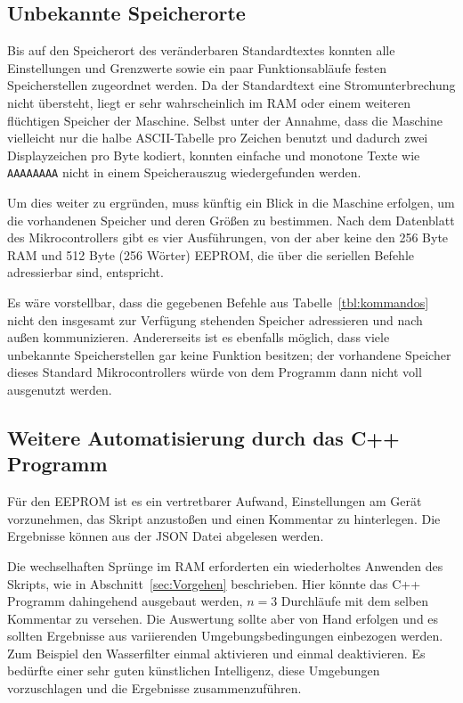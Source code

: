 \subsection{Unbekannte Speicherorte}\label{subsec:UnbekannteSpeicherorte}
Bis auf den Speicherort des veränderbaren Standardtextes konnten alle Einstellungen und Grenzwerte sowie ein paar Funktionsabläufe festen Speicherstellen zugeordnet werden.
Da der Standardtext eine Stromunterbrechung nicht übersteht, liegt er sehr wahrscheinlich im \ac{RAM} oder einem weiteren flüchtigen Speicher der Maschine.
Selbst unter der Annahme, dass die Maschine vielleicht nur die halbe \ac{ASCII}-Tabelle pro Zeichen benutzt und dadurch zwei Displayzeichen pro Byte kodiert, konnten einfache und monotone Texte wie \texttt{AAAAAAAA} nicht in einem Speicherauszug wiedergefunden werden.

Um dies weiter zu ergründen, muss künftig ein Blick in die Maschine erfolgen, um die vorhandenen Speicher und deren Größen zu bestimmen.
Nach dem Datenblatt des Mikrocontrollers \cite{JuraMicrocontroller} gibt es vier Ausführungen, von der aber keine den 256 Byte \ac{RAM} und 512 Byte (256 Wörter) \ac{EEPROM}, die über die seriellen Befehle adressierbar sind, entspricht.

Es wäre vorstellbar, dass die gegebenen Befehle aus Tabelle~\ref{tbl:kommandos} nicht den insgesamt zur Verfügung stehenden Speicher adressieren und nach außen kommunizieren.
Andererseits ist es ebenfalls möglich, dass viele unbekannte Speicherstellen gar keine Funktion besitzen;
der vorhandene Speicher dieses Standard Mikrocontrollers würde von dem Programm dann nicht voll ausgenutzt werden.

\subsection{Weitere Automatisierung durch das C++ Programm}
Für den \ac{EEPROM} ist es ein vertretbarer Aufwand, Einstellungen am Gerät vorzunehmen, das Skript anzustoßen und einen Kommentar zu hinterlegen.
Die Ergebnisse können aus der \ac{JSON} Datei abgelesen werden.

Die wechselhaften Sprünge im \ac{RAM} erforderten ein wiederholtes Anwenden des Skripts, wie in Abschnitt~\ref{sec:Vorgehen} beschrieben.
Hier könnte das C++ Programm dahingehend ausgebaut werden, $n=3$ Durchläufe mit dem selben Kommentar zu versehen.
Die Auswertung sollte aber von Hand erfolgen und es sollten Ergebnisse aus variierenden Umgebungsbedingungen einbezogen werden.
Zum Beispiel den Wasserfilter einmal aktivieren und einmal deaktivieren.
Es bedürfte einer sehr guten künstlichen Intelligenz, diese Umgebungen vorzuschlagen und die Ergebnisse zusammenzuführen.

